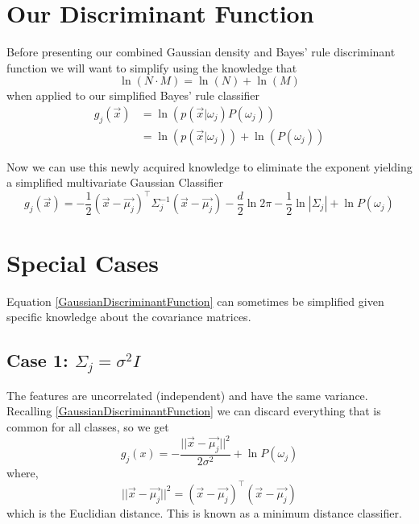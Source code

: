 \documentclass[12pt, a4paper]{report}
\begin{document}
	\section*{Our Discriminant Function}
	Before presenting our combined Gaussian density and Bayes' rule discriminant function we will want to simplify using the knowledge that
	\begin{equation}
		\ln(N\cdot M) = \ln(N)+\ln(M)
	\end{equation}
	when applied to our simplified Bayes' rule classifier
	\begin{align}
		g_j(\vec{x}) &= \ln(p(\vec{x}|\omega_j)P(\omega_j)) \\
		&= \ln(p(\vec{x}|\omega_j)) + \ln(P(\omega_j))
	\end{align}
	
	Now we can use this newly acquired knowledge to eliminate the exponent yielding a simplified multivariate Gaussian Classifier
	\begin{equation}
		g_j(\vec{x}) = -\frac{1}{2}(\vec{x}-\vec{\mu_j})^\intercal\Sigma_j^{-1}(\vec{x}-\vec{\mu_j})-\frac{d}{2}\ln2\pi-\frac{1}{2}\ln|\Sigma_j| + \ln P(\omega_j)
		\label{GaussianDiscriminantFunction}
	\end{equation}
	
	\section*{Special Cases}
	Equation \eqref{GaussianDiscriminantFunction} can sometimes be simplified given specific knowledge about the covariance matrices.
	\subsection*{Case 1: $\Sigma_j=\sigma^2I$}
	The features are uncorrelated (independent) and have the same variance. Recalling \eqref{GaussianDiscriminantFunction}	 we can discard everything that is common for all classes, so we get
	\begin{equation}
		g_j(x) = -\frac{||\vec{x}-\vec{\mu_j}||^2}{2\sigma^2} + \ln P(\omega_j)
	\end{equation}
	where, 
	\begin{equation}
		||\vec{x}-\vec{\mu_j}||^2 = (\vec{x}-\vec{\mu_j})^\intercal(\vec{x}-\vec{\mu_j})
	\end{equation}
	which is the Euclidian distance. This is known as a minimum distance classifier.
	
\end{document}
